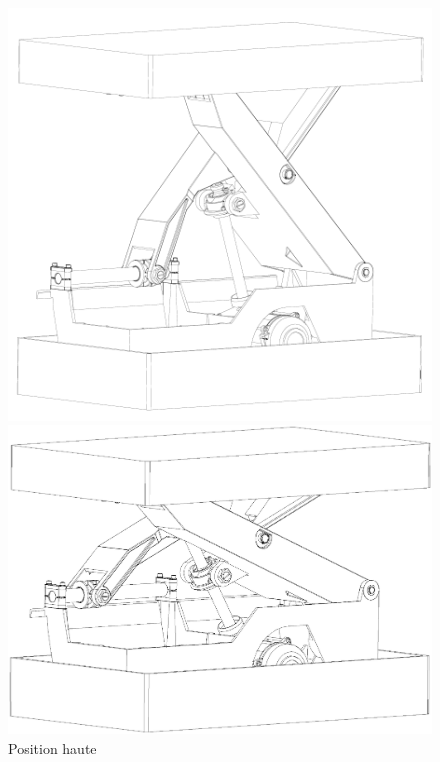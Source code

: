 \begin{figure}[htbp]
\begin{minipage}[c]{.55\linewidth}
\begin{center}
\includegraphics[width=\linewidth]{img/pos_haute.png}
\caption{Position haute}
\label{fig:image4}
\end{center}
\end{minipage}
\hfill
\begin{minipage}[c]{.4\linewidth}
\begin{center}
\includegraphics[width=\linewidth]{img/perspective.png}

\end{center}
\end{minipage}
\end{figure}
